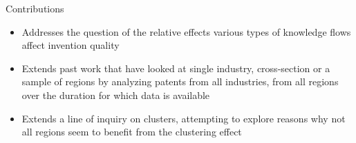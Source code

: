 \documentclass{beamer}
\begin{document}
\begin{frame}{Contributions}{}
\begin{itemize}
\item{Addresses the question of the relative effects various types of knowledge flows affect invention quality}
\item{Extends past work that have looked at single industry, cross-section or a sample of regions by analyzing patents from all industries, from all regions over the duration for which data is available}
\item{Extends a line of inquiry on clusters, attempting to explore reasons why not all regions seem to benefit from the clustering effect}
\end{itemize}
\end{frame}



\end{document}
